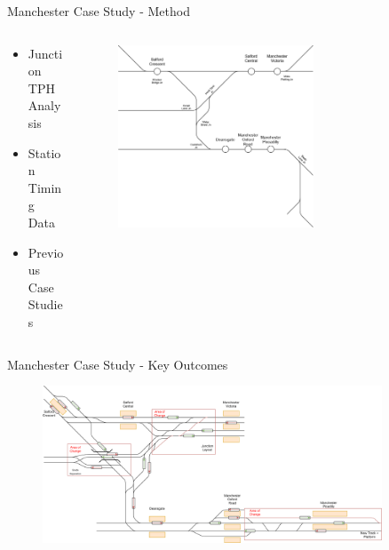 \documentclass[aspectratio=169]{beamer}
\begin{document}
\begin{frame}{Manchester Case Study - Method}
    \begin{columns}[T, onlytextwidth]
        \begin{column}{0.2\textwidth}
            \begin{itemize}
                \item Junction TPH Analysis
                \item Station Timing Data
                \item Previous Case Studies
            \end{itemize}
        \end{column}
        \begin{column}{0.7\textwidth}
            \begin{figure}
                \centering
                \includegraphics[width=0.65\textwidth]{assets/Case/Geography.jpg}
            \end{figure}
        \end{column}
    \end{columns}
\end{frame}

\begin{frame}{Manchester Case Study - Key Outcomes}
    \begin{figure}
        \centering
        \includegraphics[width=0.9\textwidth]{assets/Case/FullManchester.png}
    \end{figure}
\end{frame}
\end{document}
